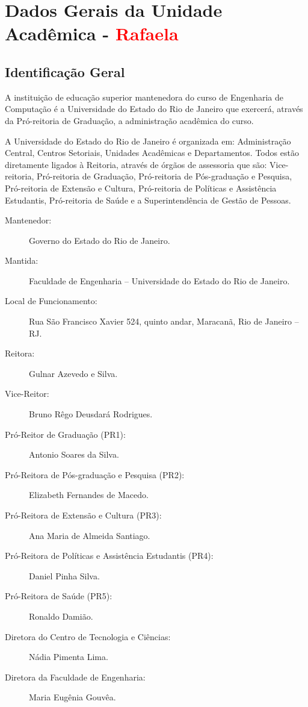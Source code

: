 \chapter{Dados Gerais da Unidade Acadêmica - \textcolor{red}{Rafaela}}


\section{Identificação Geral}

A instituição de educação superior mantenedora do curso de Engenharia de Computação é a Universidade do Estado do Rio de Janeiro que exercerá, através da Pró-reitoria de Graduação, a administração acadêmica do curso.

A Universidade do Estado do Rio de Janeiro é organizada em: Administração Central, Centros Setoriais, Unidades Acadêmicas e Departamentos. Todos estão diretamente ligados à Reitoria, através de órgãos de assessoria que são: Vice-reitoria, Pró-reitoria de Graduação, Pró-reitoria de Pós-graduação e Pesquisa, Pró-reitoria de Extensão e Cultura, Pró-reitoria de Políticas e Assistência Estudantis, Pró-reitoria de Saúde e a Superintendência de Gestão de Pessoas.


\begin{description}
	\item[Mantenedor:] Governo do Estado do Rio de Janeiro.
	\item [Mantida:] Faculdade de Engenharia -- Universidade do Estado do Rio de Janeiro.
	\item [Local de Funcionamento:] Rua São Francisco Xavier 524, quinto andar, Maracanã, Rio de Janeiro -- RJ.
	\item [Reitora:] Gulnar Azevedo e Silva.
	\item [Vice-Reitor:] Bruno Rêgo Deusdará Rodrigues.
	\item [Pró-Reitor de Graduação (PR1):] Antonio Soares da Silva.
	\item [Pró-Reitora de Pós-graduação e Pesquisa (PR2):] Elizabeth Fernandes de Macedo.
	\item [Pró-Reitora de Extensão e Cultura (PR3):] Ana Maria de Almeida Santiago.
	\item [Pró-Reitora de Políticas e Assistência Estudantis (PR4):] Daniel Pinha Silva.
	\item [Pró-Reitora de Saúde (PR5):] Ronaldo Damião.
	\item [Diretora do Centro de Tecnologia e Ciências:] Nádia Pimenta Lima.
	\item [Diretora da Faculdade de Engenharia:]  Maria Eugênia Gouvêa.
\end{description}

